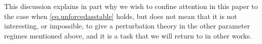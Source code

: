 \documentclass[a4paper,10pt,reqno]{amsart}
\numberwithin{equation}{section}
\theoremstyle{definition}
\theoremstyle{remark}
\DeclareMathOperator{\1}{\mathbbm 1}
\begin{document}
	This discussion explains in part why we wish to confine attention in this paper to the case when \eqref{eq.unforcedasstable} holds, but does not mean that it is not interesting, or impossible, to give a perturbation theory in the other parameter regimes mentioned above, and it is a task that we will return to in other works. 
	
	
	
\end{document}
